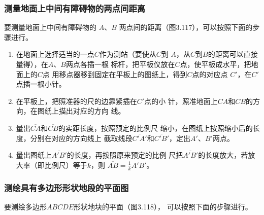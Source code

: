 \subsubsection{测量地面上中间有障碍物的两点间距离}
要测量地面上中间有障碍物的 $A$、$B$ 两点间的距离（图3.117），可以按照下面的步骤进行。

\begin{enumerate}
    \item 在地面上选择适当的一点$C$作为测站（要使从$C$到
$A$，从$C$到$B$的距离可以直接量得），在$A$、$B$两点各插一根
标杆，把平板仪放在$C$点，使平板成水平，把地面上的$C$点
用移点器移到固定在平板上的图纸上，得到$C$点的对应点
$C'$，在$C'$点插一根小针。
\item 在平板上，把照准器的尺的边靠紧插在$C'$点的小
针，照准地面上$CA$和$CB$的方向，在图纸上描出对应的方向
线。
\item 量出$\overline{CA}$和$\overline{CB}$的实距长度，按照预定的比例尺
缩小，在图纸上按照缩小后的长度，分别在对应的方向线上
截取线段$\overline{C'A'}$和$\overline{C'B'}$，定出$A'$、$B'$两点。
\item 量出图纸上$\overline{A'B'}$的长度，再按照原来预定的比例
尺把$\overline{A'B'}$的长度放大，若放大率（即比例尺）等于$k$，则
$\overline{AB}=\frac{1}{k}\overline{A'B'}$。
\end{enumerate}

\begin{figure}
    \centering
    \caption{}
\end{figure}

\subsubsection{测绘具有多边形形状地段的平面图}
要测绘多边形$ABCDE$形状地块的平面（图3.118），
可以按照下面的步骤进行。

\begin{figure}
    \centering
\begin{tikzpicture}[>=latex]



\end{tikzpicture}
    \caption{}
\end{figure}


